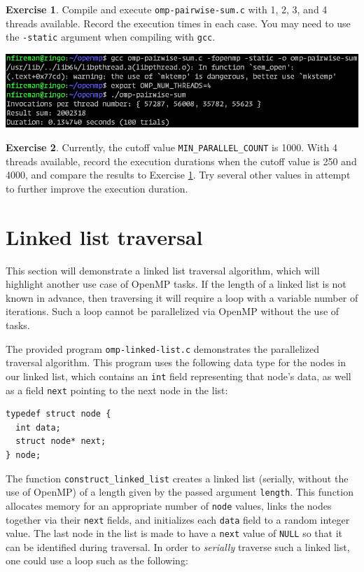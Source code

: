 \documentclass{article}
\theoremstyle{definition}
\newtheorem{exercise}{Exercise}
\begin{document}
\begin{exercise}
\label{exercise/pairwise-sum-1}
Compile and execute \texttt{omp-pairwise-sum.c} with 1, 2, 3, and 4 threads available. Record the execution times in each case. You may need to use the \texttt{-static} argument when compiling with \texttt{gcc}.

\includegraphics[width=\textwidth]{images/pairwise-sum-output.png}
\end{exercise}

\begin{exercise}
Currently, the cutoff value \texttt{MIN\_PARALLEL\_COUNT} is 1000. With 4 threads available, record the execution durations when the cutoff value is 250 and 4000, and compare the results to Exercise \ref{exercise/pairwise-sum-1}. Try several other values in attempt to further improve the execution duration.
\end{exercise}

\section{Linked list traversal}

This section will demonstrate a linked list traversal algorithm, which will highlight another use case of OpenMP tasks. If the length of a linked list is not known in advance, then traversing it will require a loop with a variable number of iterations. Such a loop cannot be parallelized via OpenMP without the use of tasks. 

The provided program \texttt{omp-linked-list.c} demonstrates the parallelized traversal algorithm. This program uses the following data type for the nodes in our linked list, which contains an \texttt{int} field representing that node's data, as well as a field \texttt{next} pointing to the next node in the list:
\begin{verbatim}
typedef struct node {
  int data;
  struct node* next;
} node;
\end{verbatim}

The function \texttt{construct\_linked\_list} creates a linked list (serially, without the use of OpenMP) of a length given by the passed argument \texttt{length}. This function allocates memory for an appropriate number of \texttt{node} values, links the nodes together via their \texttt{next} fields, and initializes each \texttt{data} field to a random integer value. The last node in the list is made to have a \texttt{next} value of \texttt{NULL} so that it can be identified during traversal. In order to \emph{serially} traverse such a linked list, one could use a loop such as the following:
\end{document}
